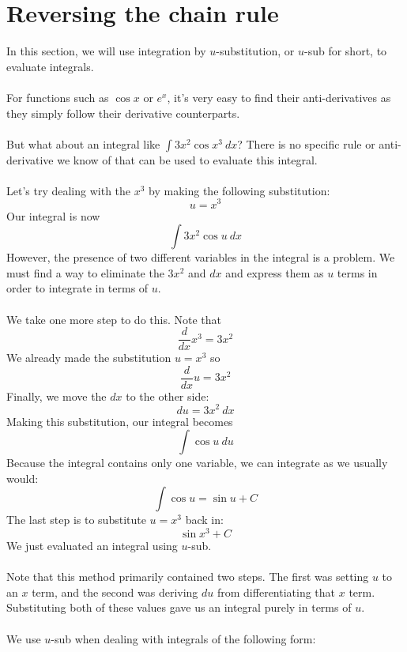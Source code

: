 \documentclass[11pt]{scrartcl}
\begin{document}
\maketitle
\noindent 

\section{Reversing the chain rule}
\noindent
In this section, we will use integration by $u$-substitution, or $u$-sub for short, to evaluate integrals. \\
\\
\noindent 
For functions such as $\cos x$ or $e^x$, it's very easy to find their anti-derivatives as they simply follow their derivative counterparts.  \\
\\
\noindent 
But what about an integral like $\int 3x^2 \cos{x^3} \ dx$? There is no specific rule or anti-derivative we know of that can be used to evaluate this integral. \\
\\
\noindent 
Let's try dealing with the $x^3$ by making the following substitution: 
$$u=x^3$$ 
\noindent 
Our integral is now 
$$\int 3x^2 \cos u \ dx$$
\noindent 
However, the presence of two different variables in the integral is a problem. We must find a way to eliminate the $3x^2$ and $dx$ and express them as $u$ terms in order to integrate in terms of $u$.\\
\\
\noindent 
We take one more step to do this. Note that 
$$\frac{d}{dx}x^3=3x^2$$
\noindent 
We already made the substitution $u=x^3$ so 
$$\frac{d}{dx}u=3x^2$$
\noindent 
Finally, we move the $dx$ to the other side: 
$$du=3x^2 \ dx$$
Making this substitution, our integral becomes
$$\int \cos u \ du$$
\noindent 
Because the integral contains only one variable, we can integrate as we usually would: 
$$\int \cos u=\sin u +C$$
\noindent 
The last step is to substitute $u=x^3$ back in: 
$$\sin x^3 + C$$
\noindent 
We just evaluated an integral using $u$-sub. \\
\\
\noindent 
Note that this method primarily contained two steps. The first was setting $u$ to an $x$ term, and the second was deriving $du$ from differentiating that $x$ term. Substituting both of these values gave us an integral purely in terms of $u$. \\
\\
\noindent 
We use $u$-sub when dealing with integrals of the following form:
\end{document}
